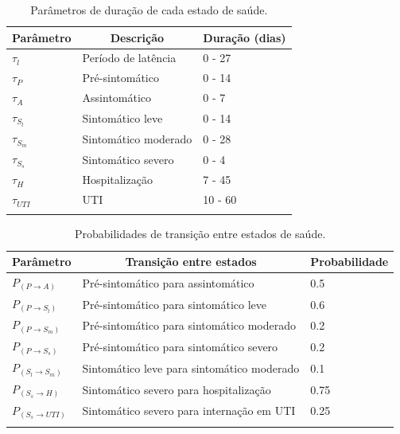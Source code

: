 \documentclass[
	12pt,				%
	openright,			%
	oneside,			%
	a4paper,			%
	english,			%
	french,				%
	spanish,			%
	brazil				%
	]{abntex2}
\begin{document}
\begin{center}
\begin{longtable}{|l|l|l|}

\hline \multicolumn{1}{|c|}{\textbf{Parâmetro}} & \multicolumn{1}{c|}{\textbf{Descrição}} & \multicolumn{1}{c|}{\textbf{Duração (dias)}} \\
\hline 


$\tau_{l}$ & Período de latência & 0 - 27  \\
$\tau_{P}$ & Pré-sintomático & 0 - 14  \\
$\tau_{A}$ & Assintomático & 0 - 7  \\
$\tau_{S_l}$ &  Sintomático leve & 0 - 14  \\
$\tau_{S_m}$ & Sintomático moderado & 0 - 28  \\
$\tau_{S_s}$ & Sintomático severo & 0 - 4  \\
$\tau_{H}$ & Hospitalização & 7 - 45  \\
$\tau_{UTI}$ & UTI & 10 - 60  \\
\hline 

\caption{Parâmetros de duração de cada estado de saúde.} \label{tab:dias} \\
\end{longtable}

\end{center}


\begin{center}
\begin{longtable}{|l|l|l|}

\hline \multicolumn{1}{|c|}{\textbf{Parâmetro}} & \multicolumn{1}{c|}{\textbf{Transição entre estados}} & \multicolumn{1}{c|}{\textbf{Probabilidade}} \\
\hline 


$P_{(P\rightarrow A)}$ & Pré-sintomático para assintomático & 0.5  \\
$P_{(P\rightarrow S_l)}$ & Pré-sintomático para sintomático leve & 0.6  \\
$P_{(P\rightarrow S_m)}$ & Pré-sintomático para sintomático moderado & 0.2  \\
$P_{(P\rightarrow S_s)}$ & Pré-sintomático para sintomático severo & 0.2  \\
$P_{(S_l\rightarrow S_m)}$ & Sintomático leve para sintomático moderado & 0.1  \\
$P_{(S_s\rightarrow H)}$ & Sintomático severo para hospitalização & 0.75  \\
$P_{(S_s\rightarrow UTI)}$ & Sintomático severo para internação em UTI & 0.25  \\

\hline 

\caption{Probabilidades de transição entre estados de saúde.} \label{tab:prob} \\
\end{longtable}
\end{center}
\end{document}
